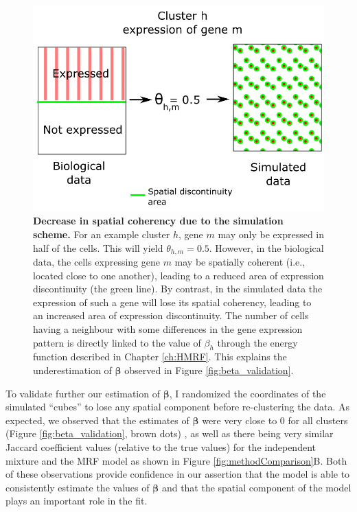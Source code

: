 	\begin{figure}[H]
\centerline{\includegraphics[width=0.8\linewidth]{gfx/chapter5/beta_error.png}}
\caption{{\bf Decrease in spatial coherency due to the simulation scheme.} For an example cluster $h$, gene $m$ may only be expressed in half of the cells. This will yield $\theta_{h,m} = 0.5$. However, in the biological data, the cells expressing gene $m$ may be spatially coherent (i.e., located close to one another), leading to a reduced area of expression discontinuity (the green line). By contrast, in the simulated data the expression of such a gene will lose its spatial coherency, leading to an increased area of expression discontinuity. The number of cells having a neighbour with some differences in the gene expression pattern is directly linked to the value of $\beta_h$ through the energy function described in Chapter \ref{ch:HMRF}. This explains the underestimation of $\boldsymbol{\beta}$ observed in Figure \ref{fig:beta_validation}.}
\label{fig:beta_error}
	\end{figure}

To validate further our estimation of $\boldsymbol{\beta}$, I randomized the coordinates of the simulated ``cubes'' to lose any spatial component before re-clustering the data. As expected, we observed that the estimates of $\boldsymbol{\beta}$ were very close to $0$ for all clusters (Figure \ref{fig:beta_validation}, brown dots) , as well as there being very similar Jaccard coefficient values (relative to the true values) for the independent mixture and the MRF model as shown in Figure \ref{fig:methodComparison}B. Both of these observations provide confidence in our assertion that the model is able to consistently estimate the values of $\boldsymbol{\beta}$ and that the spatial component of the model plays an important role in the fit.\\
	
